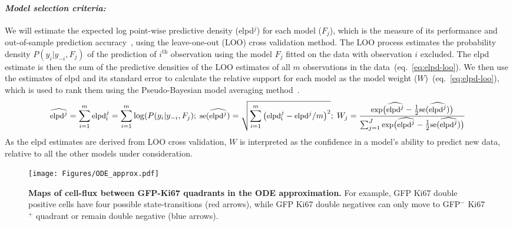 \documentclass[11pt]{article}
\newcommand{\para}[1]{\vspace*{-4.5mm}\paragraph{#1}}
\begin{document}
\para{\textit{Model selection criteria:}}
We will estimate the expected log point-wise predictive density (elpd$^{j}$) for each model ($F_{j}$), which is the measure of its performance and out-of-sample prediction accuracy~\citep{Vehtari:2016}, using the leave-one-out (LOO) cross validation method. 
The LOO process estimates the probability density $P(y_i | y_{-i}, F_j)$ of the prediction of $i^\text{th}$ observation using the model $F_j$ fitted on the data with observation $i$ excluded.
The elpd estimate is then the sum of the predictive densities of the LOO estimates of all $m$ observations in the data~(eq.~\ref{eq:elpd-loo}).
We then use the estimates of {elpd} and its standard error to calculate the relative support for each model as the model weight ($W$)~(eq.~\ref{eq:elpd-loo}), which is used to rank them using the Pseudo-Bayesian model averaging method~\citep{Yao:2018}.
\begin{equation} 
\small
\widehat{\text{elpd}^j} = \sum_{i=1}^m  \text{elpd}^j_\text{i}  = \sum_{i=1}^m \log(P(y_i | y_{-i}, F_j); \; 
\text{se}(\widehat{\text{elpd}^j})  = \sqrt{\sum_{i=1}^m  \big(\text{elpd}^j_\text{i} - \text{elpd}^j/m \big)^2 }; \;
W_j = \frac{\text{exp}\big(\widehat{\text{elpd}^j} - \frac{1}{2}\text{se}(\widehat{\text{elpd}^j})\big)}{\sum_{j=1}^J \text{exp}\big(\widehat{\text{elpd}^j} - \frac{1}{2}\text{se}(\widehat{\text{elpd}^j})\big)}
\label{eq:elpd-loo}
\end{equation}
As the {elpd} estimates are derived from LOO cross validation, $W$ is interpreted as the confidence in a model's ability to predict new data, relative to all the other models under consideration.

\begin{wrapfigure}{r}{0.26\textwidth}
\centering
\vspace*{-6mm}
\texttt{[image: Figures/ODE\_approx.pdf]}
\vspace*{-7mm}
\caption{\textbf{Maps of cell-flux between GFP-Ki67 quadrants in the ODE approximation.} 
For example, GFP Ki67 double positive cells have four possible state-transitions (red arrows), while GFP Ki67 double negatives can only move to GFP$^-$ Ki67$^+$ quadrant or remain double negative (blue arrows).}
\vspace*{-6mm}
\label{fig:ode_approx}
\end{wrapfigure}
\end{document}

